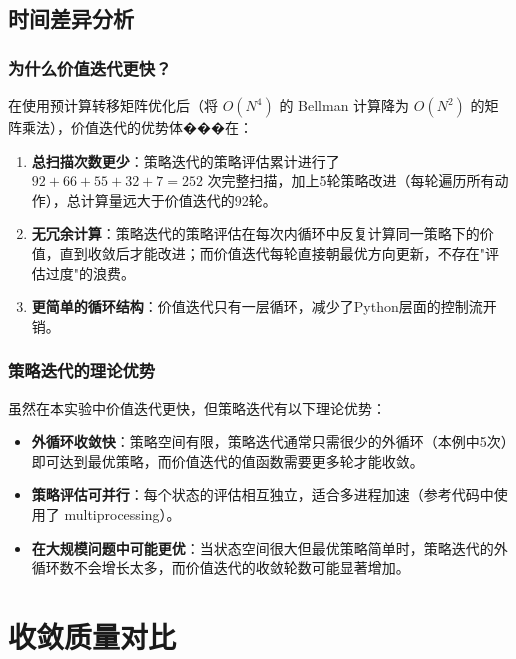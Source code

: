 \documentclass[12pt,a4paper]{ctexart}
\begin{document}
\subsection{时间差异分析}

\subsubsection{为什么价值迭代更快？}

在使用预计算转移矩阵优化后（将 $O(N^4)$ 的 Bellman 计算降为 $O(N^2)$ 的矩阵乘法），价值迭代的优势体���在：

\begin{enumerate}
  \item \textbf{总扫描次数更少}：策略迭代的策略评估累计进行了 $92+66+55+32+7=252$ 次完整扫描，加上5轮策略改进（每轮遍历所有动作），总计算量远大于价值迭代的92轮。
  \item \textbf{无冗余计算}：策略迭代的策略评估在每次内循环中反复计算同一策略下的价值，直到收敛后才能改进；而价值迭代每轮直接朝最优方向更新，不存在"评估过度"的浪费。
  \item \textbf{更简单的循环结构}：价值迭代只有一层循环，减少了Python层面的控制流开销。
\end{enumerate}

\subsubsection{策略迭代的理论优势}

虽然在本实验中价值迭代更快，但策略迭代有以下理论优势：
\begin{itemize}[leftmargin=2em]
  \item \textbf{外循环收敛快}：策略空间有限，策略迭代通常只需很少的外循环（本例中5次）即可达到最优策略，而价值迭代的值函数需要更多轮才能收敛。
  \item \textbf{策略评估可并行}：每个状态的评估相互独立，适合多进程加速（参考代码中使用了 multiprocessing）。
  \item \textbf{在大规模问题中可能更优}：当状态空间很大但最优策略简单时，策略迭代的外循环数不会增长太多，而价值迭代的收敛轮数可能显著增加。
\end{itemize}

\section{收敛质量对比}
\end{document}
